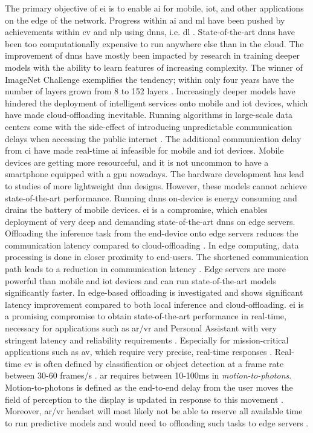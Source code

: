 The primary objective of \gls{ei} is to enable \gls{ai} for mobile, \gls{iot}, and other applications on the edge of the network. Progress within \gls{ai} and \gls{ml} have been pushed by achievements within \acrfull{cv} and \gls{nlp} using \gls{dnn}s, i.e. \gls{dl} \cite{stoica_berkeley_2017}. State-of-the-art \gls{dnn}s have been too computationally expensive to run anywhere else \cite{zhou_edge_2019} than in the cloud. The improvement of \gls{dnn}s have mostly been impacted by research in training deeper models with the ability to learn features of increasing complexity. The winner of ImageNet Challenge exemplifies the tendency; within only four years have the number of layers grown from 8 to 152 layers \cite{russakovsky_imagenet_2015}. Increasingly deeper models have hindered the deployment of intelligent services onto mobile and \gls{iot} devices, which have made cloud-offloading inevitable. Running algorithms in large-scale data centers come with the side-effect of introducing unpredictable communication delays when accessing the public internet \cite{shi_edge_2016}. The additional communication delay from \gls{ci} have made real-time \gls{ai} infeasible for mobile and \gls{iot} devices. Mobile devices are getting more resourceful, and it is not uncommon to have a smartphone equipped with a \gls{gpu} nowadays. The hardware development has lead to studies of more lightweight \gls{dnn} designs. However, these models cannot achieve state-of-the-art performance. Running \gls{dnn}s on-device is energy consuming and drains the battery of mobile devices.
\gls{ei} is a compromise, which enables deployment of very deep and demanding state-of-the-art \gls{dnn}s on edge servers. Offloading the inference task from the end-device onto edge servers reduces the communication latency compared to cloud-offloading \cite{zhou_edge_2019}. In edge computing, data processing is done in closer proximity to end-users. The shortened communication path leads to a reduction in communication latency \cite{shi_edge_2016}. Edge servers are more powerful than mobile and \gls{iot} devices and can run state-of-the-art models significantly faster. In \cite{karlsen_prototyping_nodate} edge-based offloading is investigated and shows significant latency improvement compared to both local inference and cloud-offloading. \gls{ei} is a promising compromise to obtain state-of-the-art performance in real-time, necessary for applications such as \gls{ar}/\gls{vr} and Personal Assistant with very stringent latency and reliability requirements \cite{zhou_edge_2019}. Especially for mission-critical applications such as \gls{av}, which require very precise, real-time responses \cite{stoica_berkeley_2017}. Real-time \gls{cv} is often defined by classification or object detection at a frame rate between 30-60 frames/s \cite{chen_deep_2019}. \gls{ar} requires between 10-100ms in \emph{motion-to-photons}\cite{chen_deep_2019}. Motion-to-photons is defined as the end-to-end delay from the user moves the field of perception to the display is updated in response to this movement \cite{lavalle_virtual_2019}. Moreover, \gls{ar}/\gls{vr} headset will most likely not be able to reserve all available time to run predictive models and would need to offloading such tasks to edge servers \cite{chen_deep_2019}.

